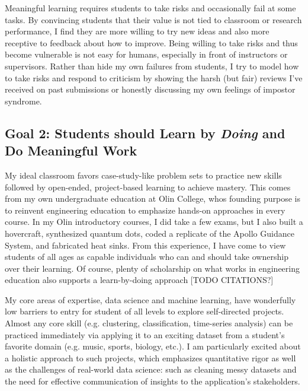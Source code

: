 \documentclass[11pt,letterpaper]{article}
\begin{document}
Meaningful learning requires students to take risks and occasionally fail at some tasks. By convincing students that their value is not tied to classroom or research performance, I find they are more willing to try new ideas and also more receptive to feedback about how to improve. 
Being willing to take risks and thus become vulnerable is not easy for humans, especially in front of instructors or supervisors. 
Rather than hide my own failures from students, I try to 
model how to take risks and respond to criticism by showing the harsh (but fair) reviews I've received on past submissions or honestly discussing my own feelings of impostor syndrome. 


\subsection*{Goal 2: Students should Learn by \emph{Doing} and Do Meaningful Work}

My ideal classroom favors case-study-like problem sets to practice new skills followed by open-ended, project-based learning to achieve mastery.
This comes from my own undergraduate education at Olin College, whos founding purpose is to reinvent engineering education to emphasize hands-on approaches in every course. In my Olin introductory courses, I did take a few exams, but I also built a hovercraft, synthesized quantum dots, coded a replicate of the Apollo Guidance System, and fabricated heat sinks. From this experience, I have come to view students of all ages as capable individuals who can and should take ownership over their learning. Of course, plenty of scholarship on what works in engineering education also supports a learn-by-doing approach [TODO CITATIONS?]

My core areas of expertise, data science and machine learning, have wonderfully low barriers to entry for student of all levels to explore self-directed projects.
Almost any core skill (e.g. clustering, classification, time-series analysis) can be practiced immediately via applying it to an exciting dataset from a student's favorite domain (e.g. music, sports, biology, etc.). I am particularly excited about a holistic approach to such projects, which emphasizes quantitative rigor as well as the challenges of real-world data science: such as cleaning messy datasets and the need for effective communication of insights to the application's stakeholders.
\end{document}
